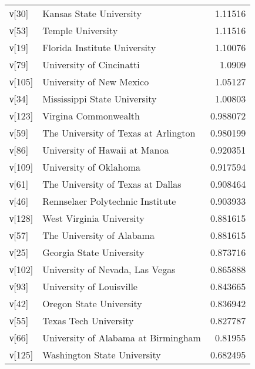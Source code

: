 \begin{tabular}{llr}
 ν[30]  & Kansas State University                                        &  1.11516  \\
 ν[53]  & Temple University                                              &  1.11516  \\
 ν[19]  & Florida Institute University                                   &  1.10076  \\
 ν[79]  & University of Cincinatti                                       &  1.0909   \\
 ν[105] & University of New Mexico                                       &  1.05127  \\
 ν[34]  & Mississippi State University                                   &  1.00803  \\
 ν[123] & Virgina Commonwealth                                           &  0.988072 \\
 ν[59]  & The University of Texas at Arlington                           &  0.980199 \\
 ν[86]  & University of Hawaii at Manoa                                  &  0.920351 \\
 ν[109] & University of Oklahoma                                         &  0.917594 \\
 ν[61]  & The University of Texas at Dallas                              &  0.908464 \\
 ν[46]  & Rennselaer Polytechnic Institute                               &  0.903933 \\
 ν[128] & West Virginia University                                       &  0.881615 \\
 ν[57]  & The University of Alabama                                      &  0.881615 \\
 ν[25]  & Georgia State University                                       &  0.873716 \\
 ν[102] & University of Nevada, Las Vegas                                &  0.865888 \\
 ν[93]  & University of Louisville                                       &  0.843665 \\
 ν[42]  & Oregon State University                                        &  0.836942 \\
 ν[55]  & Texas Tech University                                          &  0.827787 \\
 ν[66]  & University of Alabama at Birmingham                            &  0.81955  \\
 ν[125] & Washington State University                                    &  0.682495 \\

\end{tabular}
